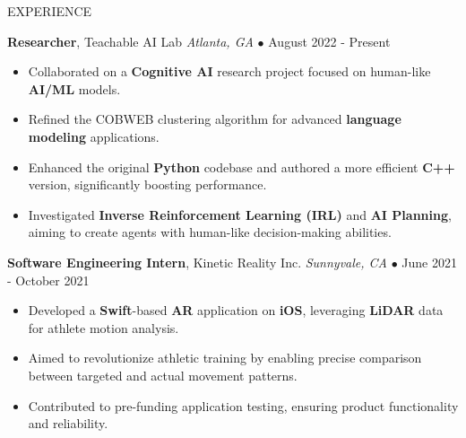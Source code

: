 \documentclass{resume} %
\begin{document}
\begin{rSection}{EXPERIENCE}
\vspace{-1mm}

\textbf{Researcher}, Teachable AI Lab \hfill \textit{Atlanta, GA} $\bullet$ August 2022 - Present
\vspace{-2mm}
\begin{itemize}
\itemsep -6pt {}

            \item Collaborated on a \textbf{Cognitive AI} research project focused on human-like \textbf{AI/ML} models.
            \item Refined the COBWEB clustering algorithm for advanced \textbf{language modeling} applications.
            \item Enhanced the original \textbf{Python} codebase and authored a more efficient \textbf{C++} version, significantly boosting performance.
            \item Investigated \textbf{Inverse Reinforcement Learning (IRL)} and \textbf{AI Planning}, aiming to create agents with human-like decision-making abilities.
        \end{itemize}

\vspace{-1mm}

\textbf{Software Engineering Intern}, Kinetic Reality Inc. \hfill \textit{Sunnyvale, CA} $\bullet$ June 2021 - October 2021
\vspace{-2mm}
\begin{itemize}
\itemsep -6pt {}

            \item Developed a \textbf{Swift}-based \textbf{AR} application on \textbf{iOS}, leveraging \textbf{LiDAR} data for athlete motion analysis.
            \item Aimed to revolutionize athletic training by enabling precise comparison between targeted and actual movement patterns.
            \item Contributed to pre-funding application testing, ensuring product functionality and reliability.
        \end{itemize}

\end{rSection}


\end{document}
